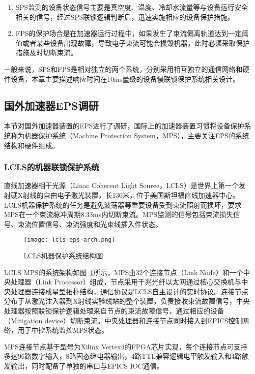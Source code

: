 \begin{enumerate}
  \item SPS监测的设备状态信号主要是真空度、温度、冷却水流量等与设备运行安全相关的信号，经过SPS联锁逻辑判断后，迅速实施相应的设备保护措施。

  \item FPS的保护场合是在加速器运行过程中，如果发生了束流偏离轨道达到一定阈值或者某些设备出现故障，导致电子束流可能会损毁机器，此时必须采取保护措施及时切断束流。
\end{enumerate}

一般来说，SPS和FPS是相对独立的两个系统，分别采用相互独立的通信网络和硬件设备，本章主要描述响应时间在10ms量级的设备慢联锁保护系统相关设计。

\subsection{国外加速器EPS调研}
本节对国外加速器装置的EPS进行了调研，国际上的加速器装置习惯将设备保护系统称为机器保护系统（Machine Protection System，MPS），主要关注EPS的系统结构和硬件组成。

\subsubsection{LCLS的机器联锁保护系统}

直线加速器相干光源（Linac Coherent Light Source，LCLS）是世界上第一个发射硬X射线的自由电子激光装置，长130米，位于美国斯坦福直线加速器中心。LCLS机器保护系统的任务是避免波荡器等重要设备受到束流照射而损坏，要求MPS在一个束流脉冲周期8.33ms内切断束流。MPS监测的信号包括束流损失信号、束流位置信号、束流强度和光束线插入件状态。

\begin{figure}[!htb]
	\centering
	\texttt{[image: lcls-eps-arch.png]}
	\caption{LCLS机器保护系统结构图}
	\label{fig:lcls-eps-arch}
\end{figure}

LCLS MPS的系统架构如图~\ref{fig:lcls-eps-arch}所示，MPS由32个连接节点（Link Node）和一个中央处理器（Link Processor）组成，节点采用千兆光纤以太网通过核心交换机与中央处理器连接成星型拓扑结构，通信协议是LCLS自主设计的实时协议。连接节点分布于从激光注入器到X射线实验线站的整个装置，负责接收束流故障信号，中央处理器按照联锁保护逻辑处理来自节点的束流故障信号，通过相应的设备（Mitigation device）切断束流。中央处理器和连接节点同时接入到EPICS控制网络，用于中控系统监控MPS状态。

MPS连接节点基于型号为Xilinx Vertex4的FPGA芯片实现，每个连接节点可支持多达96路数字输入，8路固态继电器输出，4路TTL兼容逻辑电平触发输入和4路触发输出，同时配备了单独的串口与EPICS IOC通信。

